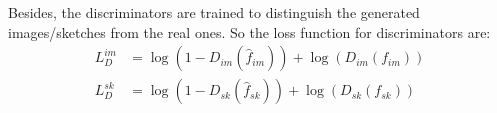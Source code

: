 \documentclass[10pt,twocolumn,letterpaper]{article}
\begin{document}
Besides, the discriminators are trained to distinguish the generated images/sketches from the real ones. So the loss function for discriminators are:
\begin{align}
    L_{D}^{im} &= \log(1\!-\!D_{im}(\hat{f}_{im})) \!+\! \log(D_{im}(f_{im})) \\
    L_{D}^{sk} &= \log(1\!-\!D_{sk}(\hat{f}_{sk})) \!+\! \log(D_{sk}(f_{sk}))
\end{align}


\end{document}
